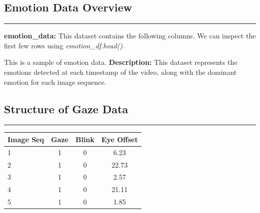 \documentclass{article}
\begin{document}
   
\subsection{Emotion Data Overview}
\begin{center}
    \color{green}\rule{1\linewidth}{0.7mm}
\end{center}
\textbf{emotion\_data:} This dataset contains the following columns. We can inspect the first few rows using \textit{emotion\_df.head()}.
\vspace{0.2in}
\begin{tcolorbox}[colback=backgroundColor, colframe==accentColor2, title=Emotion Data Sample, fonttitle=\bfseries]
This is a sample of emotion data.
\noindent \textbf{Description:} This dataset represents the emotions detected at each timestamp of the video, along with the dominant emotion for each image sequence.
\\
\end{tcolorbox}

\subsection{Structure of Gaze Data}
\begin{center}
    \color{green}\rule{1\linewidth}{0.7mm}
\end{center}
\begin{tcolorbox}[colback=backgroundColor, colframe=accentColor2, title=Gaze Data Structure, fonttitle=\bfseries]
\begin{tabular}{p{2.5cm} ccc}
\toprule
\textbf{Image Seq} & \textbf{Gaze} & \textbf{Blink} & \textbf{Eye Offset} \\
\midrule
1 & 1 & 0 & 6.23 \\
2 & 1 & 0 & 22.73 \\
3 & 1 & 0 & 2.57 \\
4 & 1 & 0 & 21.11 \\
5 & 1 & 0 & 1.85 \\
\bottomrule
\end{tabular}
\end{tcolorbox}
\end{document}
